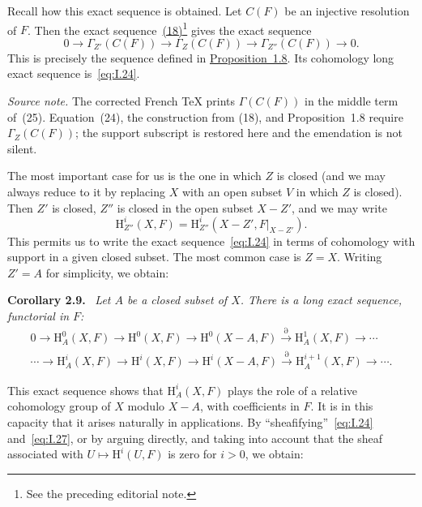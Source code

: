 \documentclass[11pt,a4paper,oneside]{book}
\providecommand{\srcpage}[1]{%
  \marginpar{\raggedright\scriptsize\color{gray}Original French p.~#1}}
\providecommand{\restr}[2]{#1\vert_{#2}}
\newenvironment{sgastatement}[1]
  {\par\addvspace{0.8\baselineskip}\noindent\textbf{#1.}\ \itshape}
  {\par\addvspace{0.35\baselineskip}}
\theoremstyle{plain}
\theoremstyle{definition}
\theoremstyle{remark}
\begin{document}
Recall how this exact sequence is obtained. Let $C(F)$ be an injective
resolution of $F$. Then the exact sequence~\hyperref[eq:I.18]{(18)}\footnote{See the preceding
editorial note.} gives the exact sequence
\begin{equation}
  0\longrightarrow\Gamma_{Z'}(C(F))
  \longrightarrow\Gamma_Z(C(F))
  \longrightarrow\Gamma_{Z''}(C(F))
  \longrightarrow0.
  \tag{25}\label{eq:I.25}
\end{equation}
This is precisely the sequence defined in \hyperref[I.1.8]{Proposition~1.8}. Its cohomology
long exact sequence is~\eqref{eq:I.24}.

\noindent\textit{Source note.} The corrected French TeX prints
$\Gamma(C(F))$ in the middle term of~(25). Equation~(24), the construction
from (18), and Proposition~1.8 require $\Gamma_Z(C(F))$; the support
subscript is restored here and the emendation is not silent.

The most important case for us is the one in which $Z$ is closed (and we may
always reduce to it by replacing $X$ with an open subset $V$ in which $Z$ is
closed). Then $Z'$ is closed, $Z''$ is closed in the open subset $X-Z'$, and
we may write
\begin{equation}
  \mathrm H_{Z''}^i(X,F)
  =\mathrm H_{Z''}^i(X-Z',\restr{F}{X-Z'}).
  \tag{26}\label{eq:I.26}
\end{equation}
This permits us to write the exact sequence~\eqref{eq:I.24} in terms of
cohomology with support\srcpage{16} in a given closed subset. The most common
case is $Z=X$. Writing $Z'=A$ for simplicity, we obtain:

\begin{sgastatement}{Corollary 2.9}
Let $A$ be a closed subset of $X$. There is a long exact sequence,
functorial in $F$:
\begin{equation}
\begin{gathered}
  0\longrightarrow \mathrm H_A^0(X,F)
  \longrightarrow \mathrm H^0(X,F)
  \longrightarrow \mathrm H^0(X-A,F)
  \xrightarrow{\partial} \mathrm H_A^1(X,F)\longrightarrow\cdots \\
  \cdots\longrightarrow \mathrm H_A^i(X,F)
  \longrightarrow \mathrm H^i(X,F)
  \longrightarrow \mathrm H^i(X-A,F)
  \xrightarrow{\partial} \mathrm H_A^{i+1}(X,F)
  \longrightarrow\cdots .
\end{gathered}
\tag{27}\label{eq:I.27}
\end{equation}
\end{sgastatement}

This exact sequence shows that $\mathrm H_A^i(X,F)$ plays the role of a
relative cohomology group of $X$ modulo $X-A$, with coefficients in $F$. It
is in this capacity that it arises naturally in applications. By
``sheafifying''~\eqref{eq:I.24} and~\eqref{eq:I.27}, or by arguing directly,
and taking into account that the sheaf associated with
$U\mapsto\mathrm H^i(U,F)$ is zero for $i>0$, we obtain:
\end{document}
